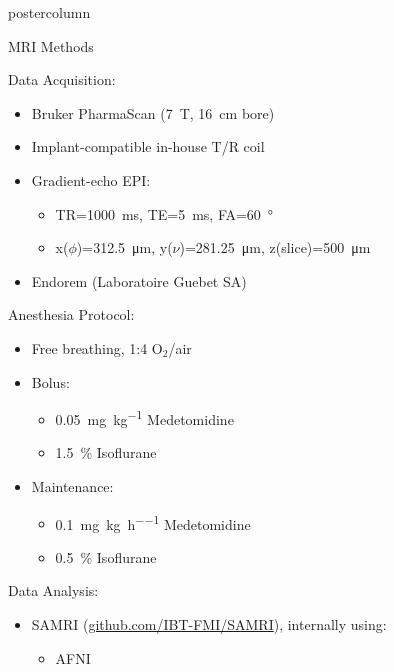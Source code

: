 \documentclass{beamer}
\begin{document}
\begin{frame}
\begin{columns}
\begin{column}{.57\textwidth}
\begin{beamercolorbox}[center]{postercolumn}
\begin{minipage}{.98\textwidth}
{\begin{myblock}{MRI Methods}
\begin{center}
\begin{minipage}{.37\textwidth}
							Data Acquisition:
								\begin{itemize}
									\item Bruker PharmaScan (\SI{7}{\tesla}, \SI{16}{\centi\metre} bore)
									\item Implant-compatible in-house T/R coil
									\item Gradient-echo EPI:
										\begin{itemize}
											\item TR=\SI{1000}{\ms}, TE=\SI{5}{\ms}, FA=\SI{60}{\degree}
											\item x($\phi$)=\SI{312.5}{\um}, y($\nu$)=\SI{281.25}{\um}, z(slice)=\SI{500}{\um}
										\end{itemize}
									\item Endorem (Laboratoire Guebet SA)
								\end{itemize}
							\end{minipage}
							\begin{minipage}{.26\textwidth}
								Anesthesia Protocol:
								\begin{itemize}
									\item Free breathing, 1:4 O$_2$/air
									\item Bolus:
										\begin{itemize}
											\item \SI{0.05}{\mg\per\kg} Medetomidine
											\item \SI{1.5}{\percent} Isoflurane
										\end{itemize}
									\item Maintenance:
										\begin{itemize}
											\item \SI{0.1}{\mg\per\kg\per\hour} Medetomidine
											\item \SI{0.5}{\percent} Isoflurane
										\end{itemize}
								\end{itemize}
							\end{minipage}
							\begin{minipage}{.32\textwidth}
								Data Analysis:
								\begin{itemize}
									\item SAMRI (\href{https://github.com/IBT-FMI/SAMRI}{github.com/IBT-FMI/SAMRI}), internally using:
										\begin{multicols}{3}
											\begin{itemize}
												\item AFNI

\end{itemize}
\end{multicols}
\end{itemize}
\end{minipage}
\end{center}
\end{myblock}}
\end{minipage}
\end{beamercolorbox}
\end{column}
\end{columns}
\end{frame}
\end{document}
